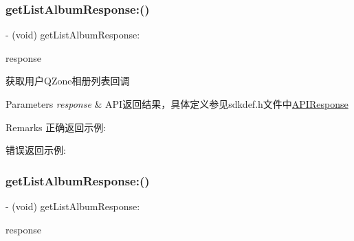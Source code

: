\subsubsection{\texorpdfstring{get\+List\+Album\+Response\+:()}{getListAlbumResponse:()}\hspace{0.1cm}{\footnotesize\ttfamily [1/2]}}
{\footnotesize\ttfamily -\/ (void) get\+List\+Album\+Response\+: \begin{DoxyParamCaption}\item[{(\mbox{\hyperlink{interface_a_p_i_response}{A\+P\+I\+Response}} $\ast$)}]{response }\end{DoxyParamCaption}\hspace{0.3cm}{\ttfamily [optional]}}

获取用户\+Q\+Zone相册列表回调 
\begin{DoxyParams}{Parameters}
{\em response} & A\+P\+I返回结果，具体定义参见sdkdef.\+h文件中\mbox{\hyperlink{interface_a_p_i_response}{A\+P\+I\+Response}} \\
\hline
\end{DoxyParams}
\begin{DoxyRemark}{Remarks}
正确返回示例\+: 
\begin{DoxyCodeInclude}
\end{DoxyCodeInclude}
 错误返回示例\+: 
\begin{DoxyCodeInclude}
\end{DoxyCodeInclude}

\end{DoxyRemark}
\mbox{\label{protocol_tencent_session_delegate-p_a51e1be4e15865ec6c54748596fffd5df}} 
\subsubsection{\texorpdfstring{get\+List\+Album\+Response\+:()}{getListAlbumResponse:()}\hspace{0.1cm}{\footnotesize\ttfamily [2/2]}}
{\footnotesize\ttfamily -\/ (void) get\+List\+Album\+Response\+: \begin{DoxyParamCaption}\item[{(\mbox{\hyperlink{interface_a_p_i_response}{A\+P\+I\+Response}} $\ast$)}]{response }\end{DoxyParamCaption}\hspace{0.3cm}{\ttfamily [optional]}}

